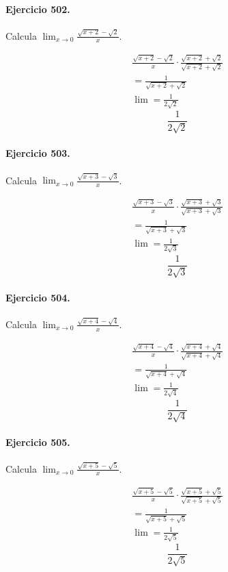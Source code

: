 \documentclass[11pt,a4paper]{article}
\begin{document}
\paragraph{Ejercicio 502.} Calcula $\displaystyle\lim_{x\to0}\frac{\sqrt{x+2}-\sqrt{2}}{x}$.

\[
\begin{aligned}
\frac{\sqrt{x+2}-\sqrt{2}}{x}\cdot \frac{\sqrt{x+2}+\sqrt{2}}{\sqrt{x+2}+\sqrt{2}}\\
=\frac{1}{\sqrt{x+2}+\sqrt{2}}\\
\lim=\frac{1}{2\sqrt{2}}
\end{aligned}
\]
\[\boxed{\frac{1}{2\sqrt{2}}}\]


\paragraph{Ejercicio 503.} Calcula $\displaystyle\lim_{x\to0}\frac{\sqrt{x+3}-\sqrt{3}}{x}$.

\[
\begin{aligned}
\frac{\sqrt{x+3}-\sqrt{3}}{x}\cdot \frac{\sqrt{x+3}+\sqrt{3}}{\sqrt{x+3}+\sqrt{3}}\\
=\frac{1}{\sqrt{x+3}+\sqrt{3}}\\
\lim=\frac{1}{2\sqrt{3}}
\end{aligned}
\]
\[\boxed{\frac{1}{2\sqrt{3}}}\]


\paragraph{Ejercicio 504.} Calcula $\displaystyle\lim_{x\to0}\frac{\sqrt{x+4}-\sqrt{4}}{x}$.

\[
\begin{aligned}
\frac{\sqrt{x+4}-\sqrt{4}}{x}\cdot \frac{\sqrt{x+4}+\sqrt{4}}{\sqrt{x+4}+\sqrt{4}}\\
=\frac{1}{\sqrt{x+4}+\sqrt{4}}\\
\lim=\frac{1}{2\sqrt{4}}
\end{aligned}
\]
\[\boxed{\frac{1}{2\sqrt{4}}}\]


\paragraph{Ejercicio 505.} Calcula $\displaystyle\lim_{x\to0}\frac{\sqrt{x+5}-\sqrt{5}}{x}$.

\[
\begin{aligned}
\frac{\sqrt{x+5}-\sqrt{5}}{x}\cdot \frac{\sqrt{x+5}+\sqrt{5}}{\sqrt{x+5}+\sqrt{5}}\\
=\frac{1}{\sqrt{x+5}+\sqrt{5}}\\
\lim=\frac{1}{2\sqrt{5}}
\end{aligned}
\]
\[\boxed{\frac{1}{2\sqrt{5}}}\]
\end{document}
